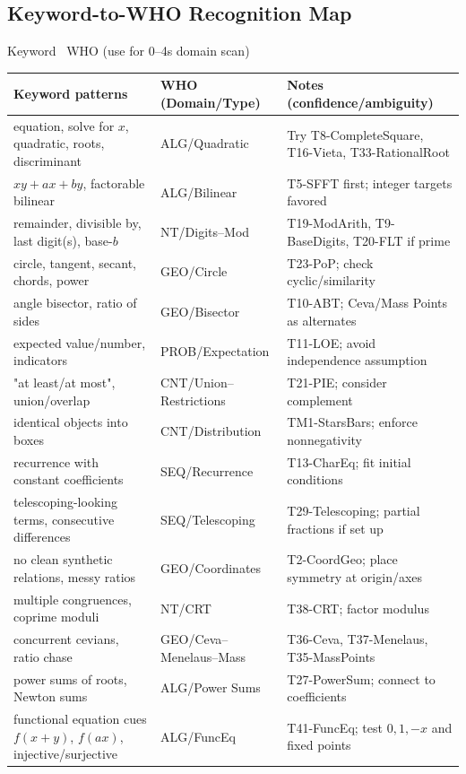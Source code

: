 \documentclass{article}
\begin{document}
\subsection*{Keyword-to-WHO Recognition Map}
\begin{classifybox}{Keyword \textrightarrow\ WHO (use for 0--4s domain scan)}
\begin{tabularx}{\textwidth}{|>{\raggedright\arraybackslash}m{}|>{\raggedright\arraybackslash}m{}|>{\raggedright\arraybackslash}X|}
\hline
\textbf{Keyword patterns} & \textbf{WHO (Domain/Type)} & \textbf{Notes (confidence/ambiguity)} \\
\hline
equation, solve for $x$, quadratic, roots, discriminant & ALG/Quadratic & Try T8-CompleteSquare, T16-Vieta, T33-RationalRoot \\
\hline
$xy+ax+by$, factorable bilinear & ALG/Bilinear & T5-SFFT first; integer targets favored \\
\hline
remainder, divisible by, last digit(s), base-$b$ & NT/Digits–Mod & T19-ModArith, T9-BaseDigits, T20-FLT if prime \\
\hline
circle, tangent, secant, chords, power & GEO/Circle & T23-PoP; check cyclic/similarity \\
\hline
angle bisector, ratio of sides & GEO/Bisector & T10-ABT; Ceva/Mass Points as alternates \\
\hline
expected value/number, indicators & PROB/Expectation & T11-LOE; avoid independence assumption \\
\hline
"at least/at most", union/overlap & CNT/Union–Restrictions & T21-PIE; consider complement \\
\hline
identical objects into boxes & CNT/Distribution & TM1-StarsBars; enforce nonnegativity \\
\hline
recurrence with constant coefficients & SEQ/Recurrence & T13-CharEq; fit initial conditions \\
\hline
telescoping-looking terms, consecutive differences & SEQ/Telescoping & T29-Telescoping; partial fractions if set up \\
\hline
no clean synthetic relations, messy ratios & GEO/Coordinates & T2-CoordGeo; place symmetry at origin/axes \\
\hline
multiple congruences, coprime moduli & NT/CRT & T38-CRT; factor modulus \\
\hline
concurrent cevians, ratio chase & GEO/Ceva–Menelaus–Mass & T36-Ceva, T37-Menelaus, T35-MassPoints \\
\hline
power sums of roots, Newton sums & ALG/Power Sums & T27-PowerSum; connect to coefficients \\
\hline
functional equation cues $f(x+y)$, $f(ax)$, injective/surjective & ALG/FuncEq & T41-FuncEq; test $0,1,-x$ and fixed points \\
\hline
\end{tabularx}
\end{classifybox}
\end{document}
